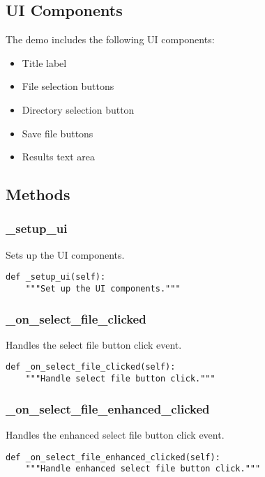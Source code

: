 \subsection{UI Components}

The demo includes the following UI components:

\begin{itemize}
    \item Title label
    \item File selection buttons
    \item Directory selection button
    \item Save file buttons
    \item Results text area
\end{itemize}

\subsection{Methods}

\subsubsection{\_setup\_ui}

Sets up the UI components.

\begin{verbatim}
def _setup_ui(self):
    """Set up the UI components."""
\end{verbatim}

\subsubsection{\_on\_select\_file\_clicked}

Handles the select file button click event.

\begin{verbatim}
def _on_select_file_clicked(self):
    """Handle select file button click."""
\end{verbatim}

\subsubsection{\_on\_select\_file\_enhanced\_clicked}

Handles the enhanced select file button click event.

\begin{verbatim}
def _on_select_file_enhanced_clicked(self):
    """Handle enhanced select file button click."""
\end{verbatim}

